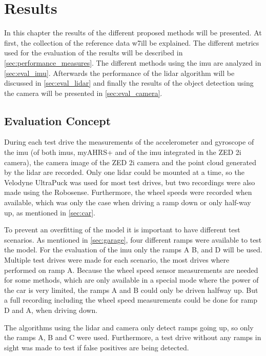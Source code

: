 \chapter{Results}
\label{ch:Results}
In this chapter the results of the different proposed methods will be presented.
At first, the collection of the reference data w7ill be explained.
The different metrics used for the evaluation of the results will be described in \cref{sec:performance_measures}.
The different methods using the \gls{imu} are analyzed in \cref{sec:eval_imu}.
Afterwards the performance of the \gls{lidar} algorithm will be discussed in \cref{sec:eval_lidar} and finally the results of the object detection using the camera will be presented in \cref{sec:eval_camera}.


\section{Evaluation Concept}
During each test drive the measurements of the accelerometer and gyroscope of the \gls{imu} (of both \glspl{imu}, myAHRS+ and of the \gls{imu} integrated in the ZED 2i camera), the camera image of the ZED 2i camera and the point cloud generated by the \gls{lidar} are recorded.
Only one \gls{lidar} could be mounted at a time, so the Velodyne UltraPuck was used for most test drives, but two recordings were also made using the Robosense.
Furthermore, the wheel speeds were recorded when available, which was only the case when driving a ramp down or only half-way up, as mentioned in \cref{sec:car}.\par
To prevent an overfitting of the model it is important to have different test scenarios.
As mentioned in \cref{sec:garage}, four different ramps were available to test the model.
For the evaluation of the \gls{imu} only the ramps A B, and D will be used.
Multiple test drives were made for each scenario, the most drives where performed on ramp A.
Because the wheel speed sensor measurements are needed for some methods, which are only available in a special mode where the power of the car is very limited, the ramps A and B could only be driven halfway up.
But a full recording including the wheel speed measurements could be done for ramp D and A, when driving down.\par
The algorithms using the \gls{lidar} and camera only detect ramps going up, so only the ramps A, B and C were used.
Furthermore, a test drive without any ramps in sight was made to test if false positives are being detected.



